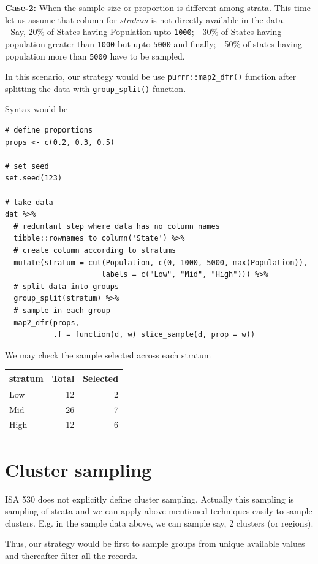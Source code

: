 \documentclass[
]{book}
\begin{document}
\textbf{Case-2:} When the sample size or proportion is different among strata.
This time let us assume that column for \emph{stratum} is not directly available in the data.\\
- Say, 20\% of States having Population upto \texttt{1000};
- 30\% of States having population greater than \texttt{1000} but upto \texttt{5000} and finally;
- 50\% of states having population more than \texttt{5000} have to be sampled.

In this scenario, our strategy would be use \texttt{purrr::map2\_dfr()} function after splitting the data with \texttt{group\_split()} function.

Syntax would be

\begin{verbatim}
# define proportions
props <- c(0.2, 0.3, 0.5)

# set seed
set.seed(123)

# take data
dat %>% 
  # reduntant step where data has no column names
  tibble::rownames_to_column('State') %>%
  # create column according to stratums
  mutate(stratum = cut(Population, c(0, 1000, 5000, max(Population)),
                      labels = c("Low", "Mid", "High"))) %>% 
  # split data into groups
  group_split(stratum) %>% 
  # sample in each group
  map2_dfr(props,
           .f = function(d, w) slice_sample(d, prop = w))
\end{verbatim}

We may check the sample selected across each stratum

\begin{tabular}{l|r|r}
\hline
stratum & Total & Selected\\
\hline
Low & 12 & 2\\
\hline
Mid & 26 & 7\\
\hline
High & 12 & 6\\
\hline
\end{tabular}

\hypertarget{cluster-sampling}{%
\section{Cluster sampling}\label{cluster-sampling}}

ISA 530 does not explicitly define cluster sampling. Actually this sampling is sampling of strata and we can apply above mentioned techniques easily to sample clusters. E.g. in the sample data above, we can sample say, 2 clusters (or regions).

Thus, our strategy would be first to sample groups from unique available values and thereafter filter all the records.
\end{document}

